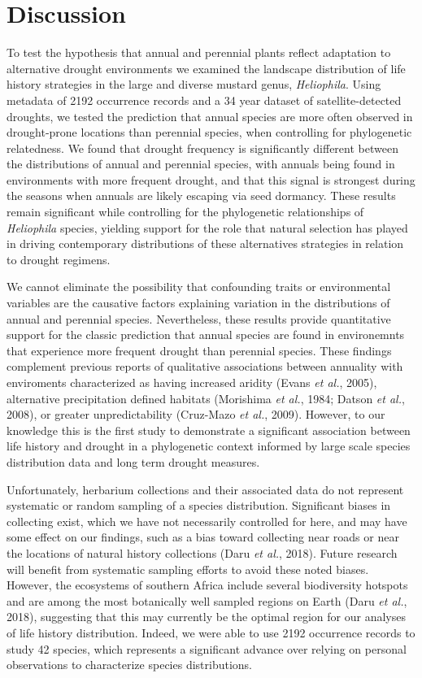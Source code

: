 \documentclass[man,floatsintext]{apa6}
\theoremstyle{definition}
\theoremstyle{definition}
\theoremstyle{definition}
\theoremstyle{remark}
\begin{document}
\hypertarget{discussion}{%
\section{Discussion}\label{discussion}}

To test the hypothesis that annual and perennial plants reflect
adaptation to alternative drought environments we examined the landscape
distribution of life history strategies in the large and diverse mustard
genus, \emph{Heliophila}. Using metadata of 2192 occurrence records and
a 34 year dataset of satellite-detected droughts, we tested the
prediction that annual species are more often observed in drought-prone
locations than perennial species, when controlling for phylogenetic
relatedness. We found that drought frequency is significantly different
between the distributions of annual and perennial species, with annuals
being found in environments with more frequent drought, and that this
signal is strongest during the seasons when annuals are likely escaping
via seed dormancy. These results remain significant while controlling
for the phylogenetic relationships of \emph{Heliophila} species,
yielding support for the role that natural selection has played in
driving contemporary distributions of these alternatives strategies in
relation to drought regimens.

We cannot eliminate the possibility that confounding traits or
environmental variables are the causative factors explaining variation
in the distributions of annual and perennial species. Nevertheless,
these results provide quantitative support for the classic prediction
that annual species are found in environemnts that experience more
frequent drought than perennial species. These findings complement
previous reports of qualitative associations between annuality with
enviroments characterized as having increased aridity (Evans \emph{et
al.}, 2005), alternative precipitation defined habitats (Morishima
\emph{et al.}, 1984; Datson \emph{et al.}, 2008), or greater
unpredictability (Cruz-Mazo \emph{et al.}, 2009). However, to our
knowledge this is the first study to demonstrate a significant
association between life history and drought in a phylogenetic context
informed by large scale species distribution data and long term drought
measures.

Unfortunately, herbarium collections and their associated data do not
represent systematic or random sampling of a species distribution.
Significant biases in collecting exist, which we have not necessarily
controlled for here, and may have some effect on our findings, such as a
bias toward collecting near roads or near the locations of natural
history collections (Daru \emph{et al.}, 2018). Future research will
benefit from systematic sampling efforts to avoid these noted biases.
However, the ecosystems of southern Africa include several biodiversity
hotspots and are among the most botanically well sampled regions on
Earth (Daru \emph{et al.}, 2018), suggesting that this may currently be
the optimal region for our analyses of life history distribution.
Indeed, we were able to use 2192 occurrence records to study 42 species,
which represents a significant advance over relying on personal
observations to characterize species distributions.
\end{document}
